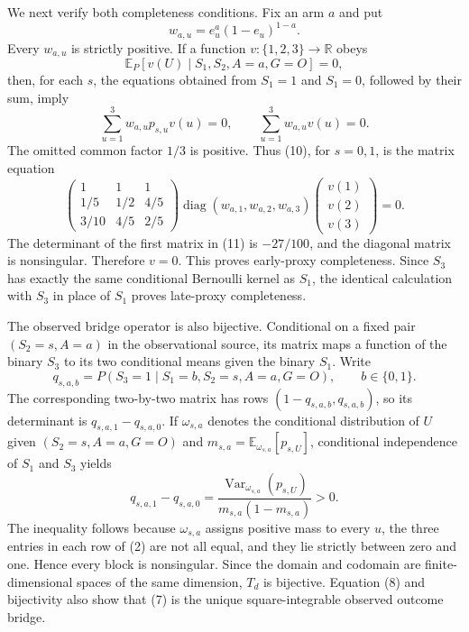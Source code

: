 We next verify both completeness conditions.  Fix an arm \(a\) and put
\[
 w_{a,u}=e_u^a(1-e_u)^{1-a}.
\]
Every \(w_{a,u}\) is strictly positive.  If a function \(v:\{1,2,3\}\to\mathbb R\) obeys
\[
 \mathbb E_P[v(U)\mid S_1,S_2,A=a,G=O]=0,
 \tag{9}
\]
then, for each \(s\), the equations obtained from \(S_1=1\) and \(S_1=0\), followed by their sum, imply
\[
 \sum_{u=1}^3 w_{a,u}p_{s,u}v(u)=0,
 \qquad
 \sum_{u=1}^3 w_{a,u}v(u)=0.
 \tag{10}
\]
The omitted common factor \(1/3\) is positive.  Thus (10), for \(s=0,1\), is the matrix equation
\[
 \begin{pmatrix}
 1&1&1\\
 1/5&1/2&4/5\\
 3/10&4/5&2/5
 \end{pmatrix}
 \operatorname{diag}(w_{a,1},w_{a,2},w_{a,3})
 \begin{pmatrix}v(1)\\v(2)\\v(3)\end{pmatrix}=0.
 \tag{11}
\]
The determinant of the first matrix in (11) is \(-27/100\), and the diagonal matrix is nonsingular.  Therefore \(v=0\).  This proves early-proxy completeness.  Since \(S_3\) has exactly the same conditional Bernoulli kernel as \(S_1\), the identical calculation with \(S_3\) in place of \(S_1\) proves late-proxy completeness.

The observed bridge operator is also bijective.  Conditional on a fixed pair \((S_2=s,A=a)\) in the observational source, its matrix maps a function of the binary \(S_3\) to its two conditional means given the binary \(S_1\).  Write
\[
 q_{s,a,b}=P(S_3=1\mid S_1=b,S_2=s,A=a,G=O),
 \qquad b\in\{0,1\}.
\]
The corresponding two-by-two matrix has rows \((1-q_{s,a,b},q_{s,a,b})\), so its determinant is \(q_{s,a,1}-q_{s,a,0}\).  If \(\omega_{s,a}\) denotes the conditional distribution of \(U\) given \((S_2=s,A=a,G=O)\) and \(m_{s,a}=\mathbb E_{\omega_{s,a}}[p_{s,U}]\), conditional independence of \(S_1\) and \(S_3\) yields
\[
 q_{s,a,1}-q_{s,a,0}
 =\frac{\operatorname{Var}_{\omega_{s,a}}(p_{s,U})}
 {m_{s,a}(1-m_{s,a})}>0.
 \tag{12}
\]
The inequality follows because \(\omega_{s,a}\) assigns positive mass to every \(u\), the three entries in each row of (2) are not all equal, and they lie strictly between zero and one.  Hence every block is nonsingular.  Since the domain and codomain are finite-dimensional spaces of the same dimension, \(T_d\) is bijective.  Equation (8) and bijectivity also show that (7) is the unique square-integrable observed outcome bridge.

